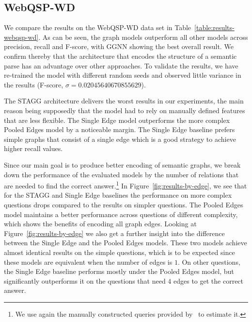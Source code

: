\documentclass[11pt]{article}
\begin{document}
\subsection{WebQSP-WD} 

We compare the results on the WebQSP-WD data set in Table~\ref{table:results-webqsp-wd}. As can be seen, the graph models outperform all other models across precision, recall and F-score, with GGNN showing the best overall result. We confirm thereby that the architecture that encodes the structure of a semantic parse has an advantage over other approaches. To validate the results, we have re-trained the model with different random seeds and observed little variance in the results (F-score, $\sigma=\num{0.02045640670855629}$).

The STAGG architecture delivers the worst results in our experiments, the main reason being supposedly that the model had to rely on manually defined features that are less flexible. The Single Edge model outperforms the more complex Pooled Edges model by a noticeable margin. The Single Edge baseline prefers simple graphs that consist of a single edge which is a good strategy to achieve higher recall values. 

Since our main goal is to produce better encoding of semantic graphs, we break down the performance of the evaluated models by the number of relations that are needed to find the correct answer.\footnote{We use again the manually constructed queries provided by~ to estimate it.} In Figure~\ref{fig:results-by-edge}, we see that for the STAGG and Single Edge baselines the performance on more complex questions drops compared to the results on simpler questions. The Pooled Edges model maintains a better performance across questions of different complexity, which shows the benefits of encoding all graph edges. 
Looking at Figure~\ref{fig:results-by-edge} we also get a further insight into the difference between the Single Edge and the Pooled Edges models. These two models achieve almost identical results on the simple questions, which is to be expected since these models are equivalent when the number of edges is $1$. On other questions, the Single Edge baseline performs mostly under the Pooled Edges model, but significantly outperforms it on the questions that need $4$ edges to get the correct answer.
\end{document}
